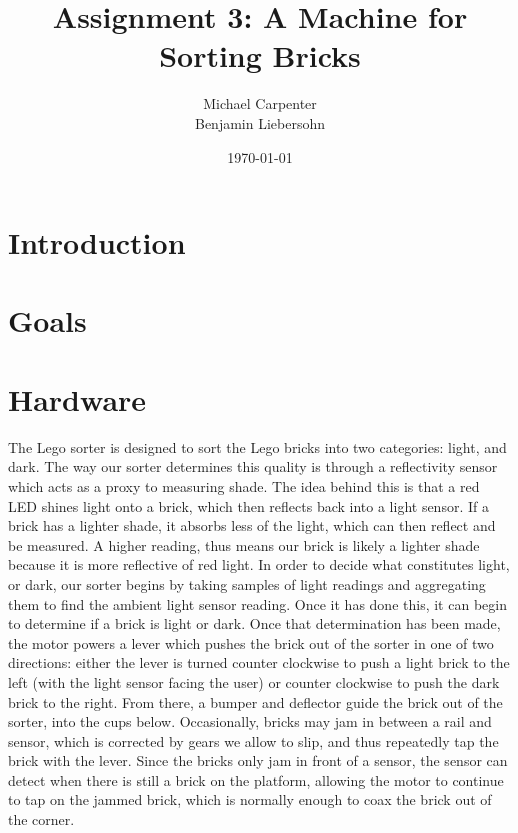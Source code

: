 \documentclass{article}
\title{Assignment 3: A Machine for Sorting Bricks}
\author{Michael Carpenter \\ Benjamin Liebersohn}
\date{\today}
\begin{document}
\maketitle

\section{Introduction}

\section{Goals}

\section{Hardware}
The Lego sorter is designed to sort the Lego bricks into two categories: light, and dark. The way our sorter determines this quality is through a reflectivity sensor which acts as a proxy to measuring shade. The idea behind this is that a red LED shines light onto a brick, which then reflects back into a light sensor. If a brick has a lighter shade, it absorbs less of the light, which can then reflect and be measured. A higher reading, thus means our brick is likely a lighter shade because it is more reflective of red light. In order to decide what constitutes light, or dark, our sorter begins by taking samples of light readings and aggregating them to find the ambient light sensor reading. Once it has done this, it can begin to determine if a brick is light or dark. Once that determination has been made, the motor powers a lever which pushes the brick out of the sorter in one of two directions: either the lever is turned counter clockwise to push a light brick to the left (with the light sensor facing the user) or counter clockwise to push the dark brick to the right. From there, a bumper and deflector guide the brick out of the sorter, into the cups below. Occasionally, bricks may jam in between a rail and sensor, which is corrected by gears we allow to slip, and thus repeatedly tap the brick with the lever. Since the bricks only jam in front of a sensor, the sensor can detect when there is still a brick on the platform, allowing the motor to continue to tap on the jammed brick, which is normally enough to coax the brick out of the corner.
\end{document}
